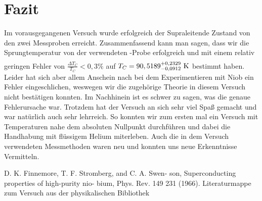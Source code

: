 \documentclass[bigchapter,colorback,accentcolor=tud4b,linedtoc,11pt]{tudreport}
\numberwithin{equation}{subsection}
\def\tol#1#2#3{\hbox{\rule{0pt}{15pt}${#1}^{+{#2}}_{-{#3}}$}}%
\begin{document}
\chapter{Fazit}
Im vorausgegangenen Versuch wurde erfolgreich der Supraleitende Zustand von den zwei Messproben erreicht. Zusammenfassend kann man sagen, dass wir die Sprungtemperatur von der verwendeten -Probe erfolgreich und mit einem relativ geringen Fehler von \(\frac{\Delta T_C}{T_C} < 0,3\% \) auf \(  T_C = \tol{90,5189}{0,2329}{0,0912} \ \mathrm{K}\) bestimmt haben.
Leider hat sich aber allem Anschein nach bei dem Experimentieren mit Niob ein Fehler eingeschlichen, weswegen wir die zugehörige Theorie in diesem Versuch nicht bestätigen konnten. Im Nachhinein ist es schwer zu sagen, was die genaue Fehlerursache war. Trotzdem hat der Versuch an sich sehr viel Spaß gemacht und war natürlich auch sehr lehrreich. So konnten wir zum ersten mal ein Versuch mit Temperaturen nahe dem absoluten Nullpunkt durchführen und dabei die Handhabung mit flüssigem Helium miterleben. Auch die in dem Versuch verwendeten Messmethoden waren neu und konnten uns neue Erkenntnisse Vermitteln.



\cleardoublepage{}

\newpage
\begin{thebibliography}{100}
   D. K. Finnemore, T. F. Stromberg, and C. A. Swen- son, Superconducting properties of high-purity nio- bium, Phys. Rev. 149 231 (1966).
   Literaturmappe zum Versuch aus der physikalischen Bibliothek
\end{thebibliography}


\cleardoublepage{}
\listoffigures
\end{document}
